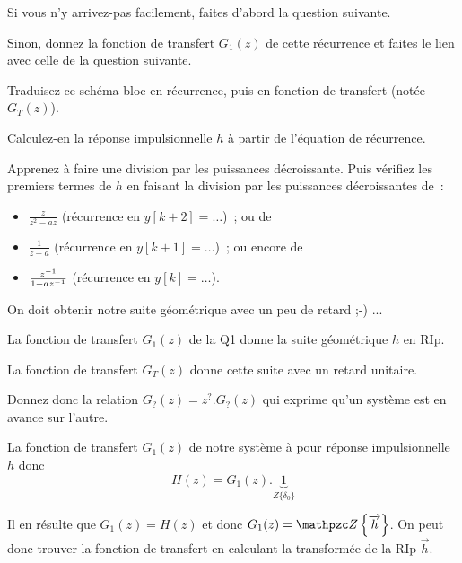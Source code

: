 Si vous n'y arrivez-pas facilement, faites d'abord la question suivante.

Sinon, donnez la fonction de transfert $G_1(z)$ de cette récurrence et
faites le lien avec celle de la question suivante.





Traduisez ce schéma bloc en récurrence, puis en fonction de transfert (notée $G_T(z)$).

Calculez-en la réponse impulsionnelle $h$ à partir de l'équation de récurrence.


\begin{remarque}
  
  Apprenez à faire une division par les puissances décroissante. Puis
  vérifiez les premiers termes de $h$ en faisant la division par les
  puissances décroissantes de~:
\begin{itemize}
\item $\frac{z}{z^2-az}$ (récurrence en $y[k+2]=\dots$)~; ou de
\item $\frac{1}{z-a}$ (récurrence en $y[k+1]=\dots$)~; ou encore de
\item $\frac{z^{-1}}{1-az^{-1}}$ (récurrence en $y[k]=\dots$).
\end{itemize}
\end{remarque}
On doit obtenir notre suite géométrique avec un peu de retard ;-) ...


La fonction de transfert $G_1(z)$ de la Q1 donne la suite géométrique $h$ en RIp.

La fonction de transfert $G_T(z)$ donne cette suite avec un retard unitaire.

Donnez donc la relation $G_?(z) = z^{?}.G_?(z)$ qui exprime qu'un système est en avance sur l'autre.




La fonction de transfert $G_1(z)$ de notre système à pour réponse
impulsionnelle $h$ donc
$$H(z) = G_1(z).\underbrace{1}_{Z\{\delta_0\}}$$

Il en résulte que $G_1(z)=H(z)$ et donc $G_1(z)=\tZde{\vec{h}}$. On
peut donc trouver la fonction de transfert en calculant la transformée
de la RIp $\vec{h}$.

